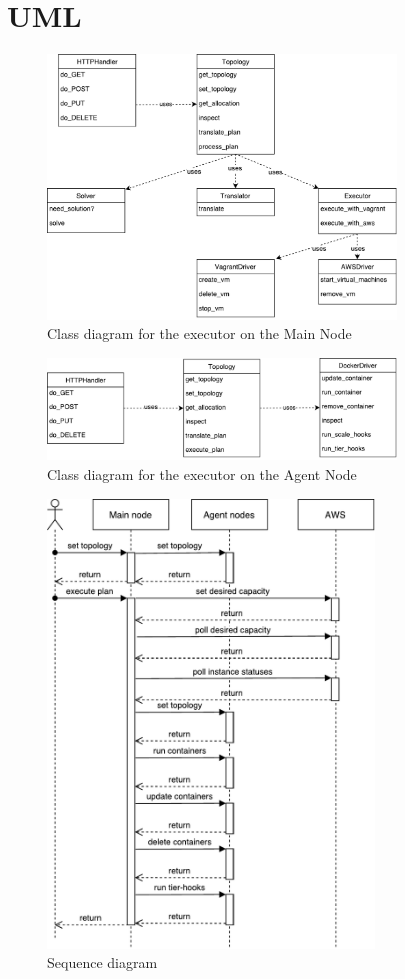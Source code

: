 \section{UML}
\begin{figure}[ht]
  \centering
    \includegraphics[width=350px,natwidth=633,natheight=482]{./pictures/implementation-main}
    \caption{Class diagram for the executor on the Main Node}
\end{figure}

\begin{figure}[ht]
  \centering
    \includegraphics[width=350px,natwidth=643,natheight=190]{./pictures/implementation-agent}
    \caption{Class diagram for the executor on the Agent Node}
\end{figure}

\begin{figure}[ht]
  \centering
    \includegraphics[height=450px,natwidth=433,natheight=593]{./pictures/sequence}
    \caption{Sequence diagram}
\end{figure}

